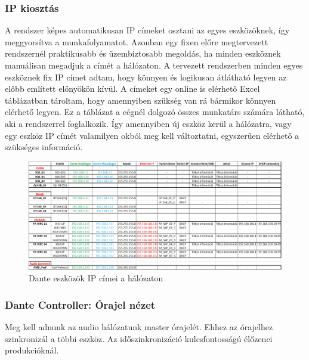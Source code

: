\subsubsection{IP kiosztás}
A rendszer képes automatikusan IP címeket osztani az egyes eszközöknek,
így meggyorsítva a munkafolyamatot.
Azonban egy fixen előre megtervezett rendszernél praktikusabb és
üzembiztosabb megoldás, ha minden eszköznek manuálisan megadjuk a címét a
hálózaton. A tervezett rendszerben minden egyes eszköznek fix IP címet adtam,
hogy könnyen és logikusan átlátható legyen az előbb említett előnyökön kívül.
A címeket egy online is elérhető Excel táblázatban tároltam, hogy amennyiben szükség van rá
bármikor könnyen elérhető legyen. Ez a táblázat a cégnél dolgozó összes munkatárs számára látható,
aki a rendszerrel foglalkozik. Így amennyiben új eszköz kerül a hálózatra, vagy egy eszköz IP címét
valamilyen okból meg kell változtatni, egyszerűen elérhető a szükséges információ.
\begin{figure}[H]
	\centering
	\includegraphics[width=\textwidth, keepaspectratio]{figures/dante_ips.png}
	\caption{Dante eszközök IP címei a hálózaton}\label{fig:dante_ips}
\end{figure}
\subsubsection{Dante Controller: Órajel nézet}
Meg kell adnunk az audio hálózatunk master órajelét. Ehhez az órajelhez
szinkronizál a többi eszköz.
Az időszinkronizáció kulcsfontosságú élőzenei produkcióknál.
